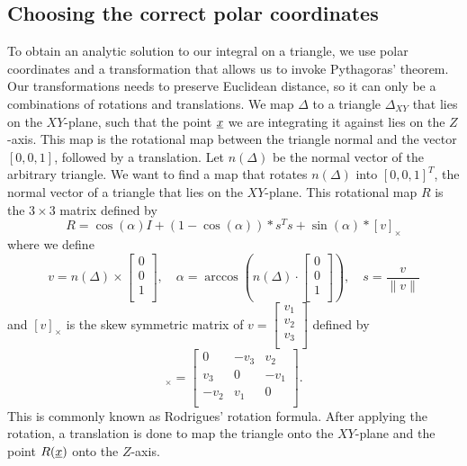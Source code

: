 \documentclass[../paper.tex]{subfiles}
\begin{document}
\subsection{Choosing the correct polar coordinates}
To obtain an analytic solution to our integral on a triangle, we use polar coordinates and a transformation that allows us to invoke Pythagoras' theorem. 
Our transformations needs to preserve Euclidean distance, so it can only be a combinations of rotations and translations.
We map $\Delta$ to a triangle $\Delta_{XY}$ that lies on the $XY$-plane, such that the point $\underline{x}$ we are integrating it against lies on the $Z$-axis. 
This map is the rotational map between the triangle normal and the vector $[0, 0, 1]$, followed by a translation. 
Let $n(\Delta)$ be the normal vector of the arbitrary triangle. We want to find a map that rotates $n(\Delta)$ into $[0, 0, 1]^T$, the normal vector of a triangle that lies on the $XY$-plane. 
This rotational map $R$ is the $3\times 3$ matrix defined by 
\begin{equation}
    R = \cos(\alpha)I +(1-\cos(\alpha))* s^T s + \sin(\alpha) * [v]_{\times} 
\end{equation}
where we define
\begin{equation*}
    v = n(\Delta) \times \begin{bmatrix}
        0\\
        0\\
        1\\
    \end{bmatrix}, \quad \alpha = \arccos\left(n(\Delta) \cdot \begin{bmatrix} 
        0\\
        0\\
        1\\
    \end{bmatrix}\right), \quad s = \frac{v}{\|v\|}
\end{equation*}
and $[v]_{\times}$ is the skew symmetric matrix of $v= \begin{bmatrix}
    v_1 \\
    v_2 \\
    v_3 \\
\end{bmatrix}$ defined by 
\begin{equation}
    [v]_{\times} = \begin{bmatrix}
        0 & -v_3 & v_2\\
        v_3 & 0 & -v_1\\
        -v_2 & v_1 & 0\\
    \end{bmatrix}.
\end{equation}
This is commonly known as Rodrigues' rotation formula.
After applying the rotation, a translation is done to map the triangle onto the $XY$-plane and the point $R(\underline{x})$ onto the $Z$-axis. 
\end{document}
